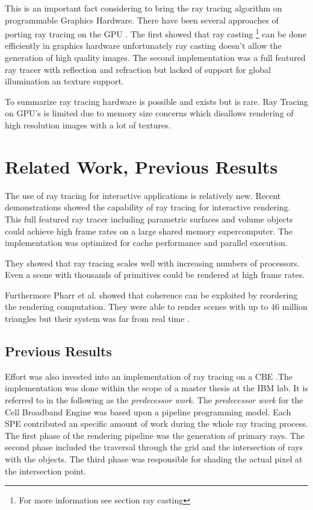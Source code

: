 \documentclass[DIV10, abstracton, openright, footsepline, headsepline, twoside, 9pt,
bigheadings]{scrreprt}
\begin{document}
This is an important fact considering to bring the ray tracing algorithm on
programmable Graphics Hardware. There have been several approaches of porting
ray tracing on the GPU \cite{Purcell03} \cite{Christen05}. The first
showed that ray casting \footnote{For more information see section ray casting}
can be done efficiently in graphics hardware unfortunately ray casting
doesn't allow the generation of high quality images. The second implementation
was a full featured ray tracer with reflection and refraction but lacked of
support for global illumination an texture support.

To summarize ray tracing hardware is possible and exists but is rare. Ray
Tracing on GPU's is limited due to memory size concerns which
disallows rendering of high resolution images with a lot of textures.

\section{Related Work, Previous Results}
The use of ray tracing for interactive applications is relatively new. Recent
demonstrations \cite{Parker99} showed the capability of ray tracing for
interactive rendering. This full featured ray tracer including parametric surfaces
and volume objects could achieve high frame rates on a large shared
memory supercomputer. The implementation \cite{Parker199} \cite{Parker299} was
optimized for cache performance and parallel execution.

They showed that ray tracing scales well with increasing numbers of processors.
Even a scene with thousands of primitives could be rendered at high frame rates.

Furthermore Pharr et al. \cite{Pharr97} showed that coherence can be exploited
by reordering the rendering computation. They were able to render scenes with
up to 46 million triangles but their system was far from real time
\cite{Wald01}.

\subsection{Previous Results}
Effort was also invested into an implementation of ray tracing on a CBE
\cite{Pablo05}.The implementation was done within the scope of a master
thesis at the IBM lab. It is referred to in the following as the
\textit{predecessor work}.
The \textit{predecessor work} for the Cell Broadband Engine was based upon a pipeline
programming model. Each SPE contributed an specific amount of work during the
whole ray tracing process. The first phase of the rendering pipeline was the
generation of primary rays. The second phase included the traversal through the
grid and the intersection of rays with the objects. The third phase was
responsible for shading the actual pixel at the intersection point.
\end{document}
